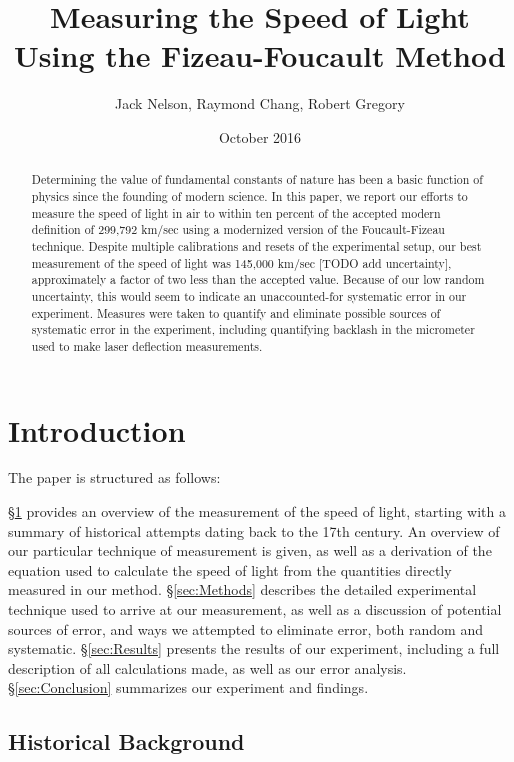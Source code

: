 \documentclass[twocolumn]{article}
\begin{document}
	
\title{Measuring the Speed of Light Using the Fizeau-Foucault Method}
\author{Jack Nelson, Raymond Chang, Robert Gregory}
\date{October 2016}

\maketitle
\begin{abstract}
	Determining the value of fundamental constants of nature has been a basic function of physics since the founding of modern science.
	In this paper, we report our efforts to measure the speed of light in air to within ten percent of the accepted modern definition of 299,792 km/sec using a modernized version of the Foucault-Fizeau technique.
	Despite multiple calibrations and resets of the experimental setup, our best measurement of the speed of light was 145,000 km/sec [TODO add uncertainty], approximately a factor of two less than the accepted value.
	Because of our low random uncertainty, this would seem to indicate an unaccounted-for systematic error in our experiment.
	Measures were taken to quantify and eliminate possible sources of systematic error in the experiment, including quantifying backlash in the micrometer used to make laser deflection measurements.
\end{abstract}	
\section{Introduction}
	\label{sec:Intro}
	The paper is structured as follows:
	
	\S\ref{sec:Intro} provides an overview of the measurement of the speed of light, starting with a summary of historical attempts dating back to the 17th century.
	An overview of our particular technique of measurement is given, as well as a derivation of the equation used to calculate the speed of light from the quantities directly measured in our method.
	\S\ref{sec:Methods} describes the detailed experimental technique used to arrive at our measurement, as well as a discussion of potential sources of error, and ways we attempted to eliminate error, both random and systematic.
	\S\ref{sec:Results} presents the results of our experiment, including a full description of all calculations made, as well as our error analysis.
	\S\ref{sec:Conclusion} summarizes our experiment and findings.
		
	\subsection{Historical Background}
	
\end{document}
